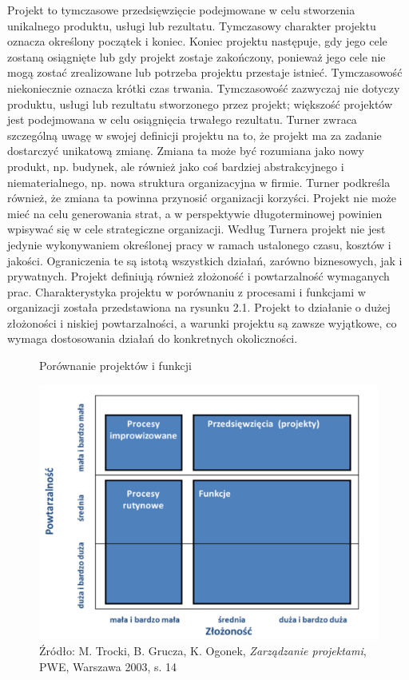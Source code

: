 Projekt to tymczasowe przedsięwzięcie podejmowane w celu stworzenia unikalnego produktu, usługi lub rezultatu. Tymczasowy charakter projektu oznacza określony początek i koniec. Koniec projektu następuje, gdy jego cele zostaną osiągnięte lub gdy projekt zostaje zakończony, ponieważ jego cele nie mogą zostać zrealizowane lub potrzeba projektu przestaje istnieć. Tymczasowość niekoniecznie oznacza krótki czas trwania. Tymczasowość zazwyczaj nie dotyczy produktu, usługi lub rezultatu stworzonego przez projekt; większość projektów jest podejmowana w celu osiągnięcia trwałego rezultatu. \autocite{pmbok}
Turner \autocite{Turner2016} zwraca szczególną uwagę w swojej definicji projektu na to, że projekt ma za zadanie dostarczyć unikatową zmianę. Zmiana ta może być rozumiana jako nowy produkt, np. budynek, ale również jako coś bardziej abstrakcyjnego i niematerialnego, np. nowa struktura organizacyjna w firmie. Turner podkreśla również, że zmiana ta powinna przynosić organizacji korzyści. Projekt nie może mieć na celu generowania strat, a w perspektywie długoterminowej powinien wpisywać się w cele strategiczne organizacji.
Według Turnera projekt nie jest jedynie wykonywaniem określonej pracy w ramach ustalonego czasu, kosztów i jakości. Ograniczenia te są istotą wszystkich działań, zarówno biznesowych, jak i prywatnych. Projekt definiują również złożoność i powtarzalność wymaganych prac. Charakterystyka projektu w porównaniu z procesami i funkcjami w organizacji została przedstawiona na rysunku 2.1. Projekt to działanie o dużej złożoności i niskiej powtarzalności, a warunki projektu są zawsze wyjątkowe, co wymaga dostosowania działań do konkretnych okoliczności.
\begin{figure}
\centering
\caption{Porównanie projektów i funkcji}
\includegraphics[width=14cm]{img/projekt.png}
\caption*{Źródło: M. Trocki, B. Grucza, K. Ogonek, \textit{Zarządzanie projektami}, PWE, Warszawa 2003, s. 14}
\end{figure}
